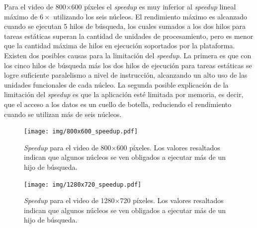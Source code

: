 Para el video de 800$\times$600 píxeles el \emph{speedup} es muy inferior al
\emph{speedup} lineal máximo de $6\times$ utilizando los seis núcleos. El
rendimiento máximo es alcanzado cuando se ejecutan 5 hilos de búsqueda, los
cuales sumados a los dos hilos para tareas estáticas superan la cantidad de
unidades de procesamiento, pero es menor que la cantidad máxima de hilos en
ejecución soportados por la plataforma. Existen dos posibles causas para la
limitación del \emph{speedup}. La primera es que con los cinco hilos de búsqueda
más los dos hilos de ejecución para tareas estáticas se logre suficiente
paralelismo a nivel de instrucción, alcanzando un alto uso de las unidades
funcionales de cada núcleo. La segunda posible explicación de la limitación del
\emph{speedup} es que la aplicación esté limitada por memoria, es decir, que el
acceso a los datos es un cuello de botella, reduciendo el rendimiento cuando se
utilizan más de seis núcleos.

\begin{figure}[!htb]

	\texttt{[image: img/800x600\_speedup.pdf]}
	\caption{\emph{Speedup} para el video de 800$\times$600 píxeles. Los
	valores resaltados indican que algunos núcleos se ven obligados a ejecutar
	más de un hijo de búsqueda.}
	\label{speedUp800}

\end{figure}

\begin{figure}[!htb]

	\texttt{[image: img/1280x720\_speedup.pdf]}
	\caption{\emph{Speedup} para el video de 1280$\times$720 píxeles. Los
	valores resaltados indican que algunos núcleos se ven obligados a ejecutar
	más de un hijo de búsqueda.}

	\label{speedUp1280}

\end{figure}
